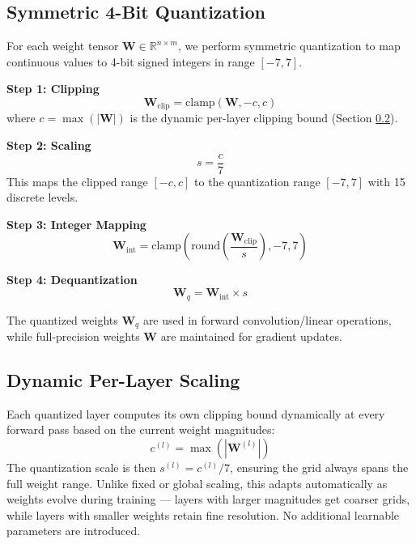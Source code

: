 \documentclass[conference]{IEEEtran}
\begin{document}
\subsection{Symmetric 4-Bit Quantization}
For each weight tensor $\mathbf{W} \in \mathbb{R}^{n \times m}$, we perform symmetric quantization to map continuous values to 4-bit signed integers in range $[-7, 7]$.

\textbf{Step 1: Clipping}
\begin{equation}
\mathbf{W}_{\text{clip}} = \text{clamp}(\mathbf{W}, -c, c)
\end{equation}
where $c = \max(|\mathbf{W}|)$ is the dynamic per-layer clipping bound (Section \ref{sec:adaptive_scaling}).

\textbf{Step 2: Scaling}
\begin{equation}
s = \frac{c}{7}
\end{equation}
This maps the clipped range $[-c, c]$ to the quantization range $[-7, 7]$ with 15 discrete levels.

\textbf{Step 3: Integer Mapping}
\begin{equation}
\mathbf{W}_{\text{int}} = \text{clamp}\left(\text{round}\left(\frac{\mathbf{W}_{\text{clip}}}{s}\right), -7, 7\right)
\end{equation}

\textbf{Step 4: Dequantization}
\begin{equation}
\mathbf{W}_q = \mathbf{W}_{\text{int}} \times s
\end{equation}

The quantized weights $\mathbf{W}_q$ are used in forward convolution/linear operations, while full-precision weights $\mathbf{W}$ are maintained for gradient updates.

\subsection{Dynamic Per-Layer Scaling}
\label{sec:adaptive_scaling}
Each quantized layer computes its own clipping bound dynamically at every forward pass based on the current weight magnitudes:
\begin{equation}
c^{(l)} = \max\left(|\mathbf{W}^{(l)}|\right)
\end{equation}
The quantization scale is then $s^{(l)} = c^{(l)} / 7$, ensuring the grid always spans the full weight range. Unlike fixed or global scaling, this adapts automatically as weights evolve during training --- layers with larger magnitudes get coarser grids, while layers with smaller weights retain fine resolution. No additional learnable parameters are introduced.
\end{document}

